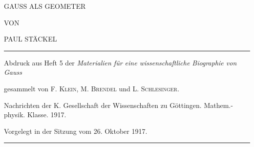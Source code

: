 \clearpage\begingroup\NoSourceHead{}
\setlength{\fboxsep}{9pt}
\noindent{}
\clearpage{}\NoSourceHead
{}
\begin{center}
\vspace*{.5in}
{\LARGE GAUSS ALS GEOMETER\par}
\vspace{1in}
VON
\vspace{.6in}

{\large PAUL STÄCKEL\par}
\vfill
\rule{\linewidth}{.4pt}\par
{\small Abdruck aus Heft 5 der \textit{Materialien für eine wissenschaftliche Biographie von Gauss}\par
gesammelt von F. \textsc{Klein}, M. \textsc{Brendel} und L. \textsc{Schlesinger}.\par
Nachrichten der K. Gesellschaft der Wissenschaften zu Göttingen. Mathem.-physik. Klasse. 1917.\par
Vorgelegt in der Sitzung vom 26. Oktober 1917.\par}
\rule{\linewidth}{.4pt}
\end{center}
